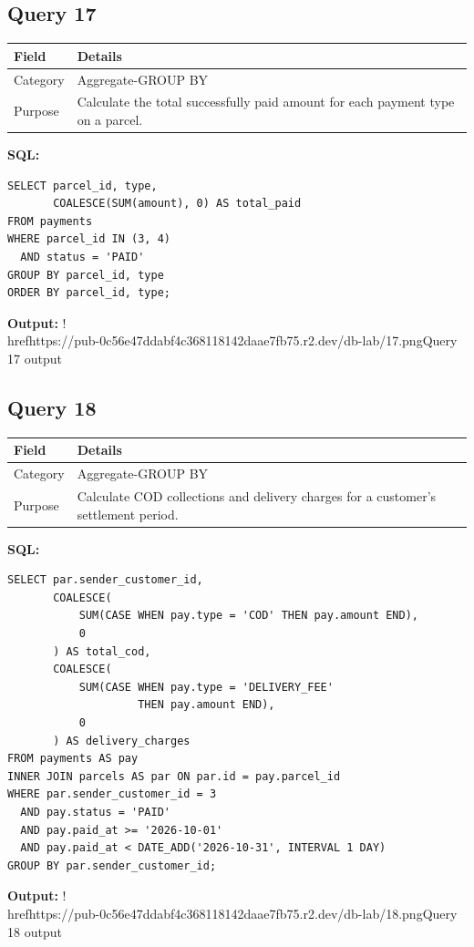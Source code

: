 \documentclass[11pt,a4paper]{article}
\begin{document}
\subsection{Query 17}
\begin{tabularx}{\linewidth}{>{\raggedright\arraybackslash}X|>{\raggedright\arraybackslash}X}
\hline
\textbf{Field} & \textbf{Details} \\ 
\hline
Category & Aggregate-GROUP BY \\ 
\hline
Purpose & Calculate the total successfully paid amount for each payment type on a parcel. \\ 
\hline
\end{tabularx}
\textbf{SQL:}
\begin{lstlisting}
SELECT parcel_id, type,
       COALESCE(SUM(amount), 0) AS total_paid
FROM payments
WHERE parcel_id IN (3, 4)
  AND status = 'PAID'
GROUP BY parcel_id, type
ORDER BY parcel_id, type;
\end{lstlisting}
\textbf{Output:}
!\\href{https://pub-0c56e47ddabf4c368118142daae7fb75.r2.dev/db-lab/17.png}{Query 17 output}
\subsection{Query 18}
\begin{tabularx}{\linewidth}{>{\raggedright\arraybackslash}X|>{\raggedright\arraybackslash}X}
\hline
\textbf{Field} & \textbf{Details} \\ 
\hline
Category & Aggregate-GROUP BY \\ 
\hline
Purpose & Calculate COD collections and delivery charges for a customer's settlement period. \\ 
\hline
\end{tabularx}
\textbf{SQL:}
\begin{lstlisting}
SELECT par.sender_customer_id,
       COALESCE(
           SUM(CASE WHEN pay.type = 'COD' THEN pay.amount END),
           0
       ) AS total_cod,
       COALESCE(
           SUM(CASE WHEN pay.type = 'DELIVERY_FEE'
                    THEN pay.amount END),
           0
       ) AS delivery_charges
FROM payments AS pay
INNER JOIN parcels AS par ON par.id = pay.parcel_id
WHERE par.sender_customer_id = 3
  AND pay.status = 'PAID'
  AND pay.paid_at >= '2026-10-01'
  AND pay.paid_at < DATE_ADD('2026-10-31', INTERVAL 1 DAY)
GROUP BY par.sender_customer_id;
\end{lstlisting}
\textbf{Output:}
!\\href{https://pub-0c56e47ddabf4c368118142daae7fb75.r2.dev/db-lab/18.png}{Query 18 output}
\end{document}
